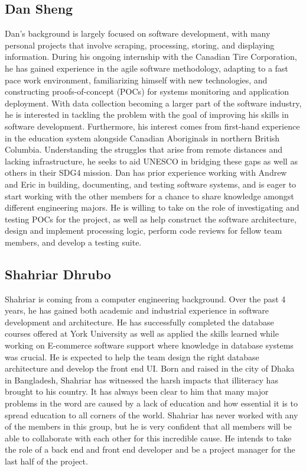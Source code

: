 \documentclass[11pt]{article}
\begin{document}
\subsection{\textbf{Dan Sheng}}
Dan's background is largely focused on software development, with many personal projects that involve scraping, processing, storing, and displaying information. During his ongoing internship with the Canadian Tire Corporation, he has gained experience in the agile software methodology, adapting to a fast pace work environment, familiarizing himself with new technologies, and constructing proofs-of-concept (POCs) for systems monitoring and application deployment. With data collection becoming a larger part of the software industry, he is interested in tackling the problem with the goal of improving his skills in software development. Furthermore, his interest comes from first-hand experience in the education system alongside Canadian Aboriginals in northern British Columbia. Understanding the struggles that arise from remote distances and lacking infrastructure, he seeks to aid UNESCO in bridging these gaps as well as others in their SDG4 mission. Dan has prior experience working with Andrew and Eric in building, documenting, and testing software systems, and is eager to start working with the other members for a chance to share knowledge amongst different engineering majors. He is willing to take on the role of investigating and testing POCs for the project, as well as help construct the software architecture, design and implement processing logic, perform code reviews for fellow team members, and develop a testing suite. \\

\subsection{\textbf{Shahriar Dhrubo}}
Shahriar is coming from a computer engineering background. Over the past 4 years, he has gained both academic and industrial experience in software development and architecture. He has successfully completed the database courses offered at York University as well as applied the skills learned while working on E-commerce software support where knowledge in database systems was crucial. He is expected to help the team design the right database architecture and develop the front end UI. Born and raised in the city of Dhaka in Bangladesh, Shahriar has witnessed the harsh impacts that illiteracy has brought to his country. It has always been clear to him that many major problems in the word are caused by a lack of education and how essential it is to spread education to all corners of the world. Shahriar has never worked with any of the members in this group, but he is very confident that all members will be able to collaborate with each other for this incredible cause. He intends to take the role of a back end and front end developer and be a project manager for the last half of the project. \\
\end{document}
